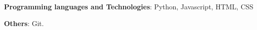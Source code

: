 \begin{cvempty} %
    \begin{cvitems} %
        \item{\textbf{Programming languages and Technologies}: Python, Javascript, HTML, CSS}
        \item{\textbf{Others}: Git.}
    \end{cvitems}
\end{cvempty}
